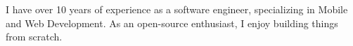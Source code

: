 \documentclass[9pt]{developercv} %
\begin{document}
\vspace{0.5cm}



\begin{minipage}[t]{0.4\textwidth} %
	\vspace{-\baselineskip} %
I have over 10 years of experience as a software engineer, specializing in Mobile and Web Development. As an open-source enthusiast, I enjoy building things from scratch.

\end{minipage}
\hfill %
\begin{minipage}[t]{0.5\textwidth} %
	\vspace{-\baselineskip} %
	\begin{barchart}{5.5}
	\end{barchart}
\end{minipage}

\end{document}
